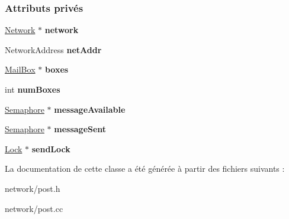 \subsubsection*{Attributs privés}
\begin{DoxyCompactItemize}
\item 
\hypertarget{class_post_office_a9cfcf52fe591f3f1b6d8d18bae9fb5f2}{}\label{class_post_office_a9cfcf52fe591f3f1b6d8d18bae9fb5f2} 
\hyperlink{class_network}{Network} $\ast$ {\bfseries network}
\item 
\hypertarget{class_post_office_a2629527ecb1896af5282890317637435}{}\label{class_post_office_a2629527ecb1896af5282890317637435} 
Network\+Address {\bfseries net\+Addr}
\item 
\hypertarget{class_post_office_ab76ac854b2245a41f7161372f8f84a86}{}\label{class_post_office_ab76ac854b2245a41f7161372f8f84a86} 
\hyperlink{class_mail_box}{Mail\+Box} $\ast$ {\bfseries boxes}
\item 
\hypertarget{class_post_office_a107b1729cd4c44edb6e4609effc6f440}{}\label{class_post_office_a107b1729cd4c44edb6e4609effc6f440} 
int {\bfseries num\+Boxes}
\item 
\hypertarget{class_post_office_a7f9c284a9400f3dc590f08d68d22c3c7}{}\label{class_post_office_a7f9c284a9400f3dc590f08d68d22c3c7} 
\hyperlink{class_semaphore}{Semaphore} $\ast$ {\bfseries message\+Available}
\item 
\hypertarget{class_post_office_ab02631a735f6822bc3a15dd7599b07d8}{}\label{class_post_office_ab02631a735f6822bc3a15dd7599b07d8} 
\hyperlink{class_semaphore}{Semaphore} $\ast$ {\bfseries message\+Sent}
\item 
\hypertarget{class_post_office_ae6c10429a2a090ca4df78b026e32fc85}{}\label{class_post_office_ae6c10429a2a090ca4df78b026e32fc85} 
\hyperlink{class_lock}{Lock} $\ast$ {\bfseries send\+Lock}
\end{DoxyCompactItemize}


La documentation de cette classe a été générée à partir des fichiers suivants \+:\begin{DoxyCompactItemize}
\item 
network/post.\+h\item 
network/post.\+cc\end{DoxyCompactItemize}
